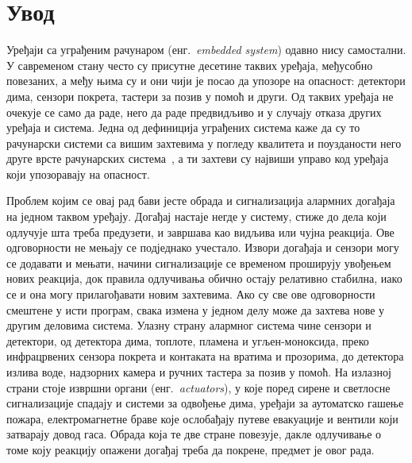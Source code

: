 \documentclass[12pt,oneside]{memoir}
\begin{document}

\frontmatter
\naslovna           %
\komisija           %
\apstrakt           %
\tableofcontents*   %

\mainmatter

\chapter{Увод}
\label{chp:uvod}
Уређаји са уграђеним рачунаром (енг.\ \textit{embedded system}) одавно нису самостални. У савременом стану често су присутне десетине
таквих уређаја, међусобно повезаних, а међу њима су и они чији је посао да упозоре на
опасност: детектори дима, сензори покрета, тастери за позив у помоћ и други. Од таквих уређаја не
очекује се само да раде, него да раде предвидљиво и у случају отказа других уређаја и
система. Једна од дефиниција уграђених система каже да су то рачунарски системи са вишим
захтевима у погледу квалитета и поузданости него друге врсте рачунарских
система~\cite{Noergaard2005}, а ти захтеви су највиши управо код уређаја који упозоравају на
опасност.

Проблем којим се овај рад бави јесте обрада и сигнализација алармних догађаја на једном
таквом уређају. Догађај настаје негде у систему, стиже до дела који одлучује шта треба
предузети, и завршава као видљива или чујна реакција. Ове одговорности не мењају се подједнако учестало.
Извори догађаја и сензори могу се додавати и мењати, начини сигнализације
се временом проширују увођењем нових реакција, док правила
одлучивања обично остају релативно стабилна, иако се и она могу
прилагођавати новим захтевима. Ако су све ове одговорности смештене у
исти програм, свака измена у једном делу може да захтева нове у другим деловима система.
Улазну страну алармног система чине сензори и детектори, од детектора дима, топлоте, пламена
и угљен-моноксида, преко инфрацрвених сензора покрета и контаката на вратима и прозорима, до
детектора излива воде, надзорних камера и ручних тастера за позив у помоћ. На излазној
страни стоје извршни органи (енг.\ \textit{actuators}), у које поред сирене и светлосне
сигнализације спадају и системи за одвођење дима, уређаји за аутоматско гашење пожара,
електромагнетне браве које ослобађају путеве евакуације и вентили који затварају довод гаса.
Обрада која те две стране повезује, дакле одлучивање о томе коју реакцију опажени догађај
треба да покрене, предмет је овог рада.
\end{document}
